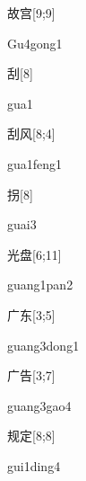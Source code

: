 \begin{verbete}[Gu4gong1]{故宫}[9;9]
\begin{pronuncia}{Gu4gong1}
\end{pronuncia}
\end{verbete}

\begin{verbete}[gua1]{刮}[8]
\begin{pronuncia}{gua1}
\end{pronuncia}
\end{verbete}

\begin{verbete}{刮风}[8;4]
\begin{pronuncia}{gua1feng1}
\end{pronuncia}
\end{verbete}

\begin{verbete}[guai3]{拐}[8]
\begin{pronuncia}{guai3}
\end{pronuncia}
\end{verbete}

\begin{verbete}{光盘}[6;11]
\begin{pronuncia}{guang1pan2}
\end{pronuncia}
\end{verbete}

\begin{verbete}{广东}[3;5]
\begin{pronuncia}{guang3dong1}
\end{pronuncia}
\end{verbete}

\begin{verbete}{广告}[3;7]
\begin{pronuncia}{guang3gao4}
\end{pronuncia}
\end{verbete}

\begin{verbete}{规定}[8;8]
\begin{pronuncia}{gui1ding4}
\end{pronuncia}
\end{verbete}


